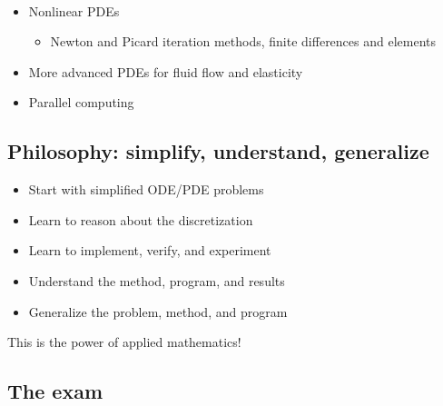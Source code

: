 \documentclass[%
oneside,                 %
final,                   %
10pt]{article}
\begin{document}
\paragraph{}
\begin{itemize}
 \item Nonlinear PDEs
\begin{itemize}

   \item Newton and Picard iteration methods, finite differences and elements

\end{itemize}

\noindent
 \item More advanced PDEs for fluid flow and elasticity

 \item Parallel computing
\end{itemize}

\noindent



\subsection*{Philosophy: simplify, understand, generalize}

\begin{itemize}
 \item Start with simplified ODE/PDE problems

 \item Learn to reason about the discretization

 \item Learn to implement, verify, and experiment

 \item Understand the method, program, and results

 \item Generalize the problem, method, and program
\end{itemize}

\noindent
This is the power of applied mathematics!

\subsection*{The exam}
\end{document}
